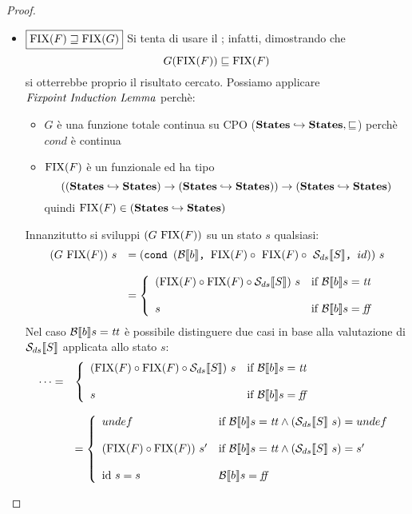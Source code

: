 {\begin{proof}
\begin{itemize}
	\item $\boxed{\textrm{\normalfont{FIX}}(F) \sqsupseteq \textrm{\normalfont{FIX}}(G)}$
	Si tenta di usare il \FPIL; infatti, dimostrando che
	$$
	G(\textrm{\normalfont{FIX}}(F)) \sqsubseteq \textrm{\normalfont{FIX}}(F)
	$$
	si otterrebbe proprio il risultato cercato.
        Possiamo applicare $\textit{Fixpoint Induction Lemma}$ perchè:
        \begin{itemize}
         \item $G$ è una funzione totale continua su CPO 
          ($\mbox{\textbf{States}} \hookrightarrow \mbox{\textbf{States}}, \sqsubseteq$) perchè $cond$ 
          è continua
         \item $\textrm{\normalfont{FIX}}(F)$ è un funzionale ed ha tipo 
          $$
          ((\mbox{\textbf{States}} \hookrightarrow \mbox{\textbf{States}}) \rightarrow 
          (\mbox{\textbf{States}} \hookrightarrow \mbox{\textbf{States}})) \rightarrow
          (\mbox{\textbf{States}} \hookrightarrow \mbox{\textbf{States}})
          $$ 
          quindi $\textrm{\normalfont{FIX}}(F) \in 
          (\mbox{\textbf{States}} \hookrightarrow \mbox{\textbf{States}})$
        \end{itemize}
        Innanzitutto si sviluppi $(G\ \fixp{F})$ su un stato $s$ qualsiasi:
        $$
        \begin{array}{ll}
          (G \ \textrm{\normalfont{FIX}}(F))\ s & = (\mbox{\normalfont{\texttt{cond }}} (\mathcal{B}{}\llbracket b \rrbracket \textrm{\normalfont{\texttt{, }}} \textrm{\normalfont{FIX}}(F) \circ\  \textrm{\normalfont{FIX}}(F) \circ \
          \mathcal{S}_{ds}\llbracket S \rrbracket \textrm{\normalfont{\texttt{, }}} id))\ s \\
          & \\
          & = \left\lbrace \begin{array}{ll} (\textrm{\normalfont{FIX}}(F) \circ{} \textrm{\normalfont{FIX}}(F) \circ{} \mathcal{S}_{ds}\llbracket S \rrbracket)\ s & \mbox{if } \mathcal{B} \llbracket b \rrbracket s =
          \mbox{\textit{tt}} \\ & \\ s & \mbox{if } \mathcal{B} \llbracket b \rrbracket s = \mbox{\textit{ff}} \\ \end{array} \right. 
        \end{array}
        $$
        Nel caso $\mathcal{B} \llbracket b \rrbracket s = \mbox{\textit{tt}}$ è possibile distinguere due casi in base
        alla valutazione di $\mathcal{S}_{ds}\llbracket S \rrbracket$ applicata allo stato $s$:
        $$
        \begin{array}{ll}
        \dots = 
        & \caseFun{(\fixp{F} \circ \fixp{F} \circ \dsCtxt{S})\ s}{\B{b} =
          \semtrue}{s}{\B{b} = \semfalse}  \\
        \\
        & = \left\lbrace 
          \begin{array}{ll}
            undef & \mbox{if } \B{b} = \semtrue \land (\dsCtxt{S}\  s) = undef  \\
            &  \\                  
            (\fixp{F} \circ \fixp{F})\ s' & \mbox{if } \B{b} = \semtrue \land (\dsCtxt{S}\ s) = s'  \\
                  & \\
            \idDS\ s = s & \B{b} = \semfalse\\
          \end{array}
          \right. \\
        \end{array}
        $$


\end{itemize}
\end{proof}}
